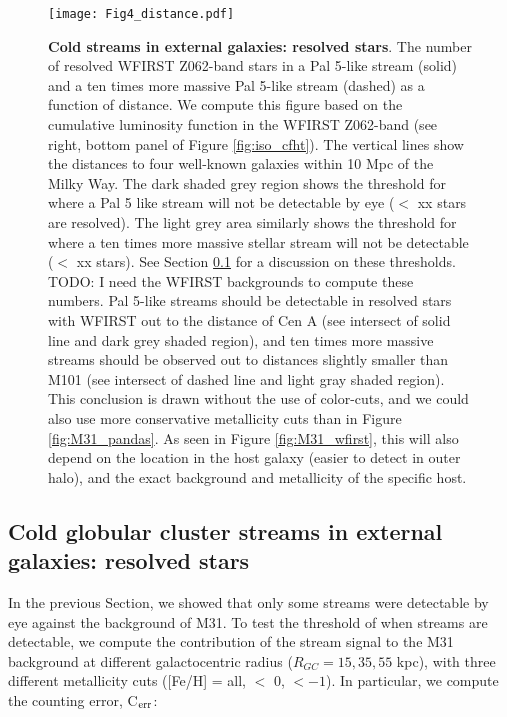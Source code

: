 \documentclass[twocolumn]{aastex62}
\newcommand{\todo}[1]{{\color{red} TODO: #1}}
\begin{document}


\begin{figure}
\centerline{\texttt{[image: Fig4\_distance.pdf]}}
\caption{{\bf Cold streams in external galaxies: resolved stars}. The number of resolved WFIRST Z062-band stars in a Pal 5-like stream (solid) and a ten times more massive Pal 5-like stream (dashed) as a function of distance. We compute this figure based on the cumulative luminosity function in the WFIRST Z062-band (see right, bottom panel of Figure \ref{fig:iso_cfht}). The vertical lines show the distances to four well-known galaxies within 10 Mpc of the Milky Way. The dark shaded grey region shows the threshold for where a Pal 5 like stream will not be detectable by eye ($<$ xx stars are resolved). The light grey area similarly shows the threshold for where a ten times more massive stellar stream will not be detectable ($<$ xx stars). See Section \ref{sec:resother} for a discussion on these thresholds.  \todo{I need the WFIRST backgrounds to compute these numbers}.
Pal 5-like streams should be detectable in resolved stars with WFIRST out to the distance of Cen A (see intersect of solid line and dark grey shaded region), and ten times more massive streams should be observed out to distances slightly smaller than M101 (see intersect of dashed line and light gray shaded region). This conclusion is drawn without the use of color-cuts, and we could also use more conservative metallicity cuts than in Figure \ref{fig:M31_pandas}. As seen in Figure \ref{fig:M31_wfirst}, this will also depend on the location in the host galaxy (easier to detect in outer halo), and the exact background and metallicity of the specific host.}
\label{fig:distance}
\end{figure}


\subsection{Cold globular cluster streams in external galaxies: resolved stars}
\label{sec:resother}
In the previous Section, we showed that only some streams were detectable by eye against the background of M31. To test the threshold of when streams are detectable, we compute the contribution of the stream signal to the M31 background at different galactocentric radius ($R_{GC} = 15, 35, 55$ kpc), with three different metallicity cuts ([Fe/H] = all, $<$ 0, $< -1$). In particular, we compute the counting error, C$_{\rm err}$: 
\end{document}

